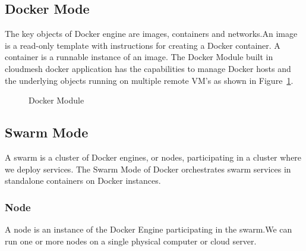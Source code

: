 \documentclass[9pt,twocolumn,twoside]{../../styles/osajnl}
\begin{document}
\subsection{Docker Mode}

The key objects of Docker engine are images, containers and networks.An image is a read-only template with instructions for creating a Docker container. A container is a runnable instance of an image.
The Docker Module built in cloudmesh docker application has the capabilities to manage Docker hosts and the underlying objects running on multiple remote VM's as shown in Figure~\ref{fig:cmsdocker}. 

\begin{figure}[h!]
\centering
{}
\caption{Docker Module }
\label{fig:cmsdocker}
\end{figure}

\subsection{Swarm Mode}

A swarm\cite{www-Swarm} is a cluster of Docker engines, or nodes, participating in a cluster where we deploy services.
The Swarm Mode of Docker orchestrates swarm services in standalone containers on Docker instances.

\subsubsection{Node}
A node is an instance of the Docker Engine participating in the swarm.We can run one or more nodes on a single physical computer or cloud server.
\end{document}

